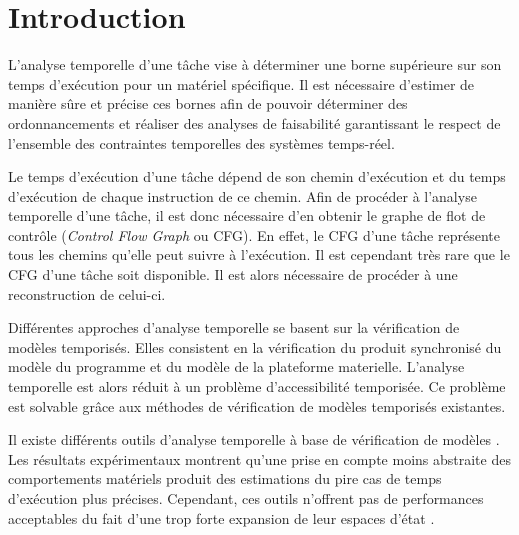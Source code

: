 \renewcommand{\baselinestretch}{1.2}
\section{Introduction}
\label{sec:introduction}


  L'analyse temporelle d'une tâche vise à déterminer une borne supérieure sur
  son temps d'exécution pour un matériel spécifique. Il est nécessaire d'estimer
  de manière sûre et précise ces bornes afin de pouvoir déterminer des
  ordonnancements et réaliser des analyses de faisabilité garantissant le
  respect de l'ensemble des contraintes temporelles des systèmes temps-réel.


  Le temps d'exécution d'une tâche dépend de son chemin d'exécution et du temps
  d'exécution de chaque instruction de ce chemin. Afin de procéder à l'analyse
  temporelle d'une tâche, il est donc nécessaire d'en obtenir le graphe de flot
  de contrôle (\emph{Control Flow Graph} ou CFG). En effet, le CFG d'une tâche
  représente tous les chemins qu'elle peut suivre à l'exécution. Il est
  cependant très rare que le CFG d'une tâche soit disponible. Il est alors
  nécessaire de procéder à une reconstruction de celui-ci.


  \vspace{1em}
  

  Différentes approches d'analyse temporelle se basent sur la vérification de
  modèles temporisés. Elles consistent en la vérification du produit synchronisé
  du modèle du programme et du modèle de la plateforme materielle. L'analyse
  temporelle est alors réduit à un problème d'accessibilité temporisée. Ce
  problème est solvable grâce aux méthodes de vérification de modèles temporisés
  existantes.

  Il existe différents outils d'analyse temporelle à base de vérification de
  modèles \cite{DOT10, CB13}. Les résultats expérimentaux montrent qu'une prise
  en compte moins abstraite des comportements matériels produit des estimations
  du pire cas de temps d'exécution plus précises. Cependant, ces outils
  n'offrent pas de performances acceptables du fait d'une trop forte expansion
  de leur espaces d'état \cite{Wil04}.

